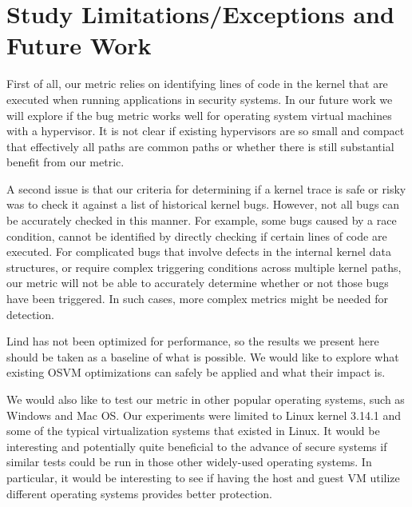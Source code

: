 \section{Study Limitations/Exceptions and Future Work}
\label{sec.limitation}


First of all, our metric relies on identifying lines of
code in the kernel that are executed when running applications in security
systems. In our future work we will explore if the bug metric works well for
operating system virtual machines with a hypervisor.  It is not clear if
existing hypervisors are so small and compact that effectively all paths
are common paths or whether there is still substantial benefit from our metric.

A second issue is that our criteria for determining if a kernel trace is
safe or risky was to  check it against a list of historical kernel bugs.
However, not all bugs can be accurately checked in this manner. For
example, some bugs caused by a race condition, cannot be identified by
directly checking if certain lines of code are executed. For complicated
bugs that involve defects in the internal kernel data structures, or
require complex triggering conditions across multiple kernel paths, our
metric will not be able to accurately determine whether or not those bugs
have been triggered. In such cases, more complex metrics might be needed
for detection.  

Lind has not been optimized for performance, so the
results we present here should be taken as a baseline of what is possible. 
We would like to explore what existing OSVM optimizations can safely
be applied and what their impact is.


We would also like to test our metric in other
popular operating systems, such as Windows and Mac OS. Our experiments were
limited to Linux kernel 3.14.1 and some of the typical virtualization
systems that existed in Linux. It would be interesting and potentially
quite beneficial to the advance of secure systems if similar tests could be
run in those other widely-used operating systems.  In particular, it would
be interesting to see if having the host and guest VM utilize different
operating systems provides better protection.


